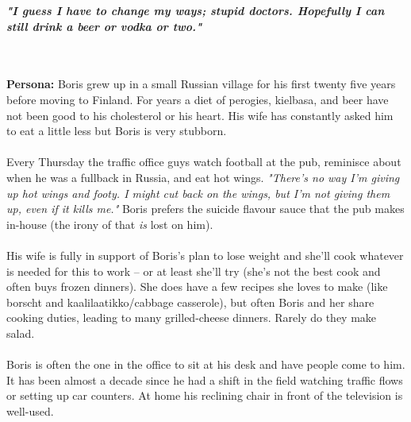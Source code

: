 \documentclass[a4paper,12pt]{article}
\begin{document}
\begin{appendices}
\begin{large}
\textbf{\textit{"I guess I have to change my ways; stupid doctors.  Hopefully I can still drink a beer or vodka or two."}}
\end{large}\\\\
\textbf{Persona:} Boris grew up in a small Russian village for his first twenty five years before moving to Finland.  For years a diet of perogies, kielbasa, and beer have not been good to his cholesterol or his heart.  His wife has constantly asked him to eat a little less but Boris is very stubborn.\\
\\
Every Thursday the traffic office guys watch football at the pub, reminisce about when he was a fullback in Russia, and eat hot wings.  \textit{"There's no way I'm giving up hot wings and footy.  I might cut back on the wings, but I'm not giving them up, even if it kills me."}  Boris prefers the suicide flavour sauce that the pub makes in-house (the irony of that \textit{is} lost on him).\\
\\
His wife is fully in support of Boris's plan to lose weight and she'll cook whatever is needed for this to work -- or at least she'll try (she's not the best cook and often buys frozen dinners).  She does have a few recipes she loves to make (like borscht and kaalilaatikko/cabbage casserole), but often Boris and her share cooking duties, leading to many grilled-cheese dinners.  Rarely do they make salad.\\
\\
Boris is often the one in the office to sit at his desk and have people come to him.  It has been almost a decade since he had a shift in the field watching traffic flows or setting up car counters.  At home his reclining chair in front of the television is well-used.
\newpage

\end{appendices}
\end{document}
